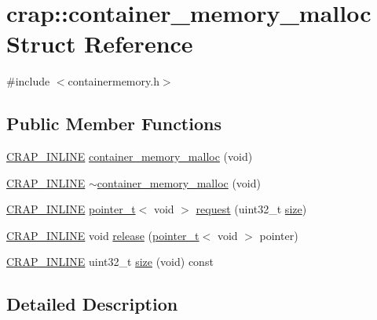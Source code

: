 \hypertarget{structcrap_1_1container__memory__malloc}{\section{crap\+:\+:container\+\_\+memory\+\_\+malloc Struct Reference}
\label{structcrap_1_1container__memory__malloc}
}


{\ttfamily \#include $<$containermemory.\+h$>$}

\subsection*{Public Member Functions}
\begin{DoxyCompactItemize}
\item 
\hyperlink{config__x86_8h_a5a40526b8d842e7ff731509998bb0f1c}{C\+R\+A\+P\+\_\+\+I\+N\+L\+I\+N\+E} \hyperlink{structcrap_1_1container__memory__malloc_a69f8f4a94204563a6487b38b4480ad07}{container\+\_\+memory\+\_\+malloc} (void)
\item 
\hyperlink{config__x86_8h_a5a40526b8d842e7ff731509998bb0f1c}{C\+R\+A\+P\+\_\+\+I\+N\+L\+I\+N\+E} \hyperlink{structcrap_1_1container__memory__malloc_a9ce2198c89a65dd4cc6f4e0dbc46541c}{$\sim$container\+\_\+memory\+\_\+malloc} (void)
\item 
\hyperlink{config__x86_8h_a5a40526b8d842e7ff731509998bb0f1c}{C\+R\+A\+P\+\_\+\+I\+N\+L\+I\+N\+E} \hyperlink{structcrap_1_1pointer__t}{pointer\+\_\+t}$<$ void $>$ \hyperlink{structcrap_1_1container__memory__malloc_ad0a8feed933d368e334589fc7ca30fa8}{request} (uint32\+\_\+t \hyperlink{structcrap_1_1container__memory__malloc_a285d0358030a97833d9af2e6487ceb02}{size})
\item 
\hyperlink{config__x86_8h_a5a40526b8d842e7ff731509998bb0f1c}{C\+R\+A\+P\+\_\+\+I\+N\+L\+I\+N\+E} void \hyperlink{structcrap_1_1container__memory__malloc_a9fa8599831b9341479ecf58ef398931e}{release} (\hyperlink{structcrap_1_1pointer__t}{pointer\+\_\+t}$<$ void $>$ pointer)
\item 
\hyperlink{config__x86_8h_a5a40526b8d842e7ff731509998bb0f1c}{C\+R\+A\+P\+\_\+\+I\+N\+L\+I\+N\+E} uint32\+\_\+t \hyperlink{structcrap_1_1container__memory__malloc_a285d0358030a97833d9af2e6487ceb02}{size} (void) const 
\end{DoxyCompactItemize}


\subsection{Detailed Description}


